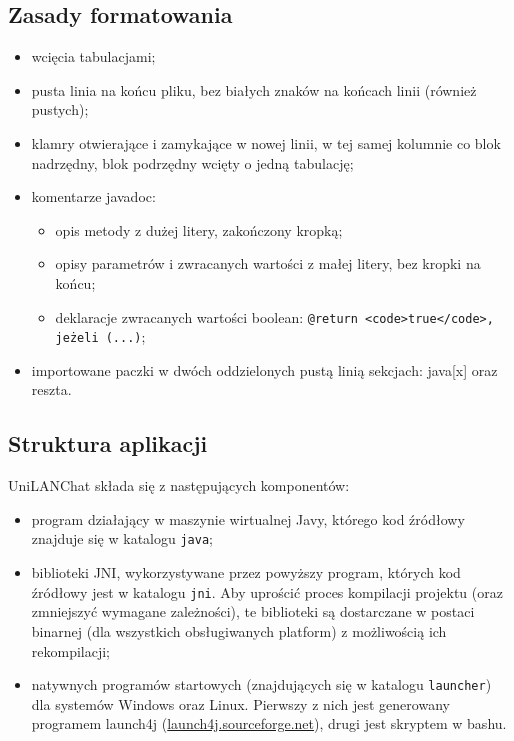 \documentclass[11pt,leqno]{article}
\begin{document}
\subsection{Zasady formatowania}
\begin{itemize}
	\item wcięcia tabulacjami;
	\item pusta linia na końcu pliku, bez białych znaków na końcach linii (również pustych);
	\item klamry otwierające i zamykające w nowej linii, w tej samej kolumnie co blok
	nadrzędny, blok podrzędny wcięty o jedną tabulację;
	\item komentarze javadoc:
	\begin{itemize}
		\item opis metody z dużej litery, zakończony kropką;
		\item opisy parametrów i zwracanych wartości z małej litery, bez kropki na końcu;
		\item deklaracje zwracanych wartości boolean:
		\texttt{@return <code>true</code>, jeżeli (...)};
	\end{itemize}
	\item importowane paczki w dwóch oddzielonych pustą linią sekcjach: java[x] oraz reszta.
\end{itemize}

\subsection{Struktura aplikacji}

UniLANChat składa się z następujących komponentów:
\begin{itemize}
	\item program działający w maszynie wirtualnej Javy, którego kod źródłowy znajduje się
	w katalogu \texttt{java};
	\item biblioteki JNI, wykorzystywane przez powyższy program, których kod źródłowy jest
	w katalogu \texttt{jni}. Aby uprościć proces kompilacji projektu (oraz zmniejszyć wymagane
	zależności), te biblioteki są dostarczane w postaci binarnej (dla wszystkich obsługiwanych
	platform) z możliwością ich rekompilacji;
	\item natywnych programów startowych (znajdujących się w katalogu \texttt{launcher}) dla
	systemów Windows oraz Linux. Pierwszy z nich jest generowany programem
	launch4j (\href{http://launch4j.sourceforge.net}{launch4j.sourceforge.net}), drugi jest skryptem w bashu.
\end{itemize}
\end{document}
